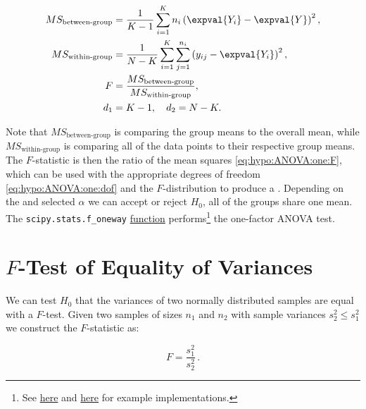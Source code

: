 \begin{subequations}\label{eq:hypo:ANOVA:one}
\begin{align}
MS_{\text{between-group}} &= \frac{1}{K-1} \sum_{i=1}^{K} n_{i}\left(\expval{Y_{i}} - \expval{Y}\right)^{2}, \label{eq:hypo:ANOVA:one:MS_between} \\
MS_{\text{within-group}} &= \frac{1}{N-K} \sum_{i=1}^{K} \sum_{j=1}^{n_{i}} \left( y_{ij} - \expval{Y_{i}} \right)^{2}, \label{eq:hypo:ANOVA:one:MS_within} \\
F &= \frac{MS_{\text{between-group}}}{MS_{\text{within-group}}}, \label{eq:hypo:ANOVA:one:F} \\
d_{1} &= K-1,\quad d_{2} = N-K. \label{eq:hypo:ANOVA:one:dof}
\end{align}
\end{subequations}

Note that $MS_{\text{between-group}}$ is comparing the group means to the overall mean,
while $MS_{\text{within-group}}$ is comparing all of the data points to their respective group means.
The $F$-statistic is then the ratio of the mean squares \cref{eq:hypo:ANOVA:one:F},
which can be used with the appropriate degrees of freedom \cref{eq:hypo:ANOVA:one:dof}
and the $F$-distribution to produce a \pvalue.
Depending on the \pvalue and selected $\alpha$
we can accept or reject $H_{0}$,
\ie all of the groups share one mean.
The \texttt{scipy.stats.f\_oneway} \href{https://docs.scipy.org/doc/scipy/reference/generated/scipy.stats.f_oneway.html#scipy.stats.f_oneway}{function}
performs\footnote{See
\href{https://www.analyticsvidhya.com/blog/2020/06/introduction-anova-statistics-data-science-covid-python/}{here} and
\href{https://www.reneshbedre.com/blog/anova.html}{here}
for example implementations.} the one-factor ANOVA test.

\section{\texorpdfstring{$F$}{F}-Test of Equality of Variances}
\label{hypo:F_test_var}

We can test $H_{0}$ that the variances of two normally distributed samples are equal with a $F$-test.
Given two samples of sizes $n_{1}$ and $n_{2}$ with sample variances $s_{2}^{2} \leq s_{1}^{2}$
we construct the $F$-statistic as:

\begin{equation}\label{eq:hypo:F_test_var}
F = \frac{s_{1}^{2}}{s_{2}^{2}}\,.
\end{equation}

